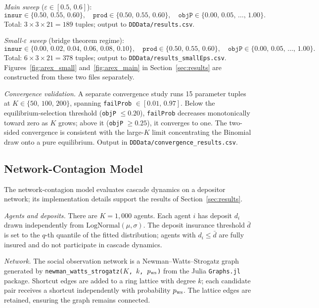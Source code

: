 \smallskip
\noindent\textit{Main sweep} ($\varepsilon \in [0.5,\, 0.6]$):
\[
  \texttt{insur} \in \{0.50,\, 0.55,\, 0.60\},\quad
  \texttt{prod}  \in \{0.50,\, 0.55,\, 0.60\},\quad
  \texttt{objP}  \in \{0.00,\, 0.05,\, \ldots,\, 1.00\}.
\]
Total: $3 \times 3 \times 21 = 189$ tuples; output to
\texttt{DDData/results.csv}.

\smallskip
\noindent\textit{Small-$\varepsilon$ sweep} (bridge theorem regime):
\[
  \texttt{insur} \in \{0.00,\, 0.02,\, 0.04,\, 0.06,\, 0.08,\, 0.10\},\quad
  \texttt{prod}  \in \{0.50,\, 0.55,\, 0.60\},\quad
  \texttt{objP}  \in \{0.00,\, 0.05,\, \ldots,\, 1.00\}.
\]
Total: $6 \times 3 \times 21 = 378$ tuples; output to
\texttt{DDData/results\_smallEps.csv}.
Figures~\ref{fig:arex_small} and~\ref{fig:arex_main} in
Section~\ref{sec:results} are constructed from these two files
separately.

\medskip

\noindent\textit{Convergence validation.}\; A separate convergence
study runs 15 parameter tuples at $K \in \{50,\, 100,\, 200\}$,
spanning \texttt{failProb} $\in [0.01,\, 0.97]$. Below the
equilibrium-selection threshold (\texttt{objP} $\leq 0.20$),
\texttt{failProb} decreases monotonically toward zero as $K$ grows;
above it (\texttt{objP} $\geq 0.25$), it converges to one. The
two-sided convergence is consistent with the large-$K$ limit
concentrating the Binomial draw onto a pure equilibrium. Output in
\texttt{DDData/convergence\_results.csv}.

\subsection{Network-Contagion Model}

The network-contagion model evaluates cascade dynamics on a depositor
network; its implementation details support the results of
Section~\ref{sec:results}.

\medskip

\noindent\textit{Agents and deposits.}\; There are $K = 1{,}000$
agents. Each agent $i$ has deposit $d_i$ drawn independently from
$\mathrm{LogNormal}(\mu, \sigma)$. The deposit insurance threshold
$\bar{d}$ is set to the $q$-th quantile of the fitted distribution;
agents with $d_i \leq \bar{d}$ are fully insured and do not
participate in cascade dynamics.

\medskip

\noindent\textit{Network.}\; The social observation network is a
Newman--Watts--Strogatz graph \citep{newman1999renormalization}
generated by \texttt{newman\_watts\_strogatz($K$,\,$k$,\,$p_{\rm ws}$)}
from the Julia \texttt{Graphs.jl} package. Shortcut edges are added
to a ring lattice with degree $k$; each candidate pair receives a
shortcut independently with probability $p_{\rm ws}$. The lattice
edges are retained, ensuring the graph remains connected.

